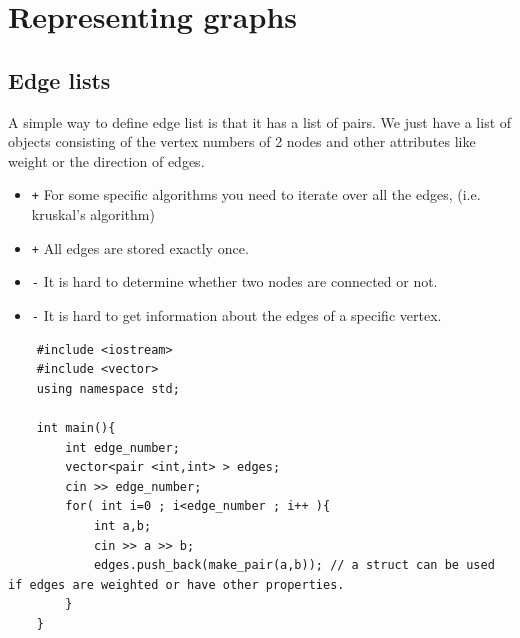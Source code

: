 \documentclass[12pt]{article}
\begin{document}
\section{Representing graphs}
    \subsection{Edge lists}
        A simple way to define edge list is that it has a list of pairs. We just have a list of objects consisting of the vertex numbers of 2 nodes and other attributes like weight or the direction of edges. \cite{16}
        \begin{itemize}
             \item \texttt + For some specific algorithms you need to iterate over all the edges, (i.e. kruskal's algorithm)
             \item \texttt + All edges are stored exactly once.
             \item \texttt - It is hard to determine whether two nodes are connected or not.
             \item \texttt - It is hard to get information about the edges of a specific vertex.
         \end{itemize}
    \begin{verbatim}
    #include <iostream>
    #include <vector>
    using namespace std;
    
    int main(){
        int edge_number;
        vector<pair <int,int> > edges;
        cin >> edge_number;
        for( int i=0 ; i<edge_number ; i++ ){
            int a,b;
            cin >> a >> b;
            edges.push_back(make_pair(a,b)); // a struct can be used if edges are weighted or have other properties.
        }
    }
    \end{verbatim}
\end{document}
